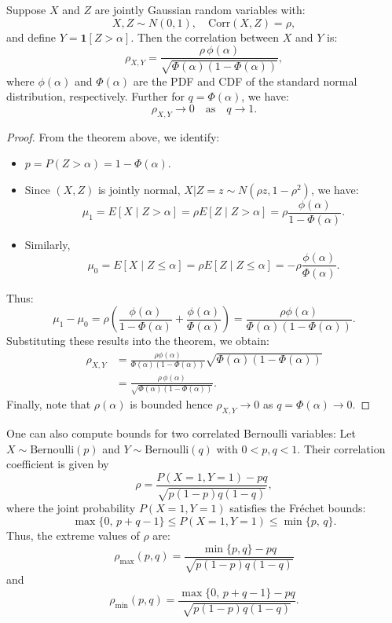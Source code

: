   \begin{corollary}
  Suppose \(X\) and \(Z\) are jointly Gaussian random variables with:
  \[
  X, Z \sim N(0,1), \quad \mathrm{Corr}(X,Z)=\rho,
  \]
  and define \(Y=\mathbf{1}[Z>\alpha]\). Then the correlation between \(X\) and \(Y\) is:
  \[
  \rho_{X,Y} = \frac{\rho\,\phi(\alpha)}{\sqrt{\Phi(\alpha)(1 - \Phi(\alpha))}},
  \]
  where \(\phi(\alpha)\) and \(\Phi(\alpha)\) are the PDF and CDF of the standard normal distribution, respectively.
  Further for \(q = \Phi(\alpha)\), we have:
  $$
\rho_{X,Y} \to 0 \quad \text{as} \quad q \to 1.
  $$
  \end{corollary}
  
  \begin{proof}
  From the theorem above, we identify:
  \begin{itemize}
  \item \(p = P(Z>\alpha) = 1-\Phi(\alpha)\).
  \item Since \((X,Z)\) is jointly normal, \(X|Z=z \sim N(\rho z, 1-\rho^2)\), we have:
  \[
  \mu_1 = E[X \mid Z>\alpha] = \rho E[Z \mid Z>\alpha] = \rho \frac{\phi(\alpha)}{1-\Phi(\alpha)}.
  \]
  \item Similarly,
  \[
  \mu_0 = E[X \mid Z \leq \alpha] = \rho E[Z \mid Z\leq\alpha] = -\rho\frac{\phi(\alpha)}{\Phi(\alpha)}.
  \]
  \end{itemize}
  Thus:
  \[
  \mu_1 - \mu_0 = \rho\left(\frac{\phi(\alpha)}{1-\Phi(\alpha)} + \frac{\phi(\alpha)}{\Phi(\alpha)}\right) = \frac{\rho\phi(\alpha)}{\Phi(\alpha)(1-\Phi(\alpha))}.
  \]
  Substituting these results into the theorem, we obtain:
  \begin{align*}
  \rho_{X,Y} &= \frac{\rho\phi(\alpha)}{\Phi(\alpha)(1-\Phi(\alpha))}\sqrt{\Phi(\alpha)(1-\Phi(\alpha))}\\[6pt]
  &= \frac{\rho\,\phi(\alpha)}{\sqrt{\Phi(\alpha)(1 - \Phi(\alpha))}}.
  \end{align*}
  Finally, note that $\rho(\alpha)$ is bounded hence $\rho_{X,Y} \rightarrow 0 $ as $q=\Phi(\alpha) \rightarrow 0$.
  \end{proof}

  One can also compute bounds for two correlated Bernoulli variables:
    Let \(X \sim \mathrm{Bernoulli}(p)\) and \(Y \sim \mathrm{Bernoulli}(q)\) with \(0 < p,q < 1\). Their correlation coefficient is given by
    \[
    \rho = \frac{P(X=1,Y=1)-pq}{\sqrt{p(1-p)q(1-q)}},
    \]
    where the joint probability \(P(X=1,Y=1)\) satisfies the Fréchet bounds:
    \[
    \max\{0,\, p+q-1\} \le P(X=1,Y=1) \le \min\{p,\, q\}.
    \]
    Thus, the extreme values of \(\rho\) are:
    \[
    \rho_{\max}(p,q) = \frac{\min\{p,q\}-pq}{\sqrt{p(1-p)q(1-q)}}
    \]
    and
    \[
    \rho_{\min}(p,q) = \frac{\max\{0,\, p+q-1\}-pq}{\sqrt{p(1-p)q(1-q)}}.
    \]
    
  
  
